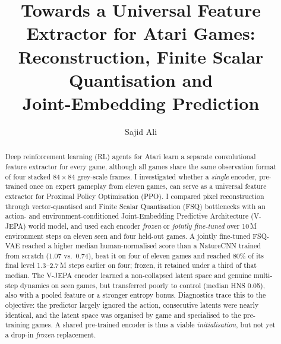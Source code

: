 \documentclass[runningheads]{llncs}
\begin{document}
\title{Towards a Universal Feature Extractor for Atari Games:\\
Reconstruction, Finite Scalar Quantisation and\\ Joint-Embedding Prediction}

\author{Sajid Ali}

\maketitle

\begin{abstract}
Deep reinforcement learning (RL) agents for Atari learn a separate convolutional feature
extractor for every game, although all games share the same observation format of four
stacked $84\times84$ grey-scale frames. I investigated whether a \emph{single} encoder,
pre-trained once on expert gameplay from eleven games, can serve as a universal feature
extractor for Proximal Policy Optimisation (PPO). I compared pixel reconstruction through
vector-quantised and Finite Scalar Quantisation (FSQ) bottlenecks with an action- and
environment-conditioned Joint-Embedding Predictive Architecture (V-JEPA) world model, and
used each encoder \emph{frozen} or \emph{jointly fine-tuned} over 10\,M environment steps on
eleven seen and four held-out games. A jointly fine-tuned FSQ-VAE reached a higher median
human-normalised score than a NatureCNN trained from scratch (1.07 vs.\ 0.74), beat it on
four of eleven games and reached 80\% of its final level 1.3--2.7\,M steps earlier on four;
frozen, it retained under a third of that median. The V-JEPA encoder learned a
non-collapsed latent space and genuine multi-step dynamics on seen games, but transferred
poorly to control (median HNS 0.05), also with a pooled feature or a stronger entropy
bonus. Diagnostics trace this to the objective: the predictor largely ignored the action,
consecutive latents were nearly identical, and the latent space was organised by game and
specialised to the pre-training games. A shared pre-trained encoder is thus a viable
\emph{initialisation}, but not yet a drop-in \emph{frozen} replacement.

\end{abstract}
\end{document}
